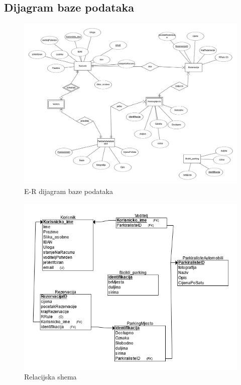 \subsection{Dijagram baze podataka}
\begin{figure}[H]
	\includegraphics[width=\textwidth]{slike/erldiagram.PNG} %
	\centering
	\caption{E-R dijagram baze podataka}
	\label{fig:erldijagram}
\end{figure}

\begin{figure}[H]
	\includegraphics[scale=0.7]{slike/rlcdiagram.PNG} %
	\caption{Relacijska shema}
	\label{fig:relshema} %
\end{figure}










